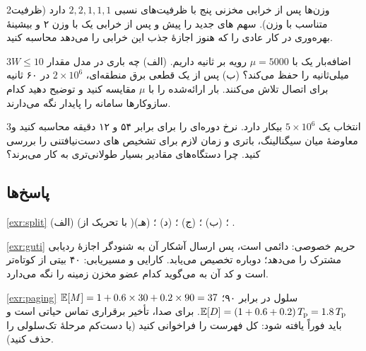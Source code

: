 \documentclass[11pt,a4paper]{article}
\begin{document}
\begin{exercisebox}{2}{وزن‌ها پس از خرابی}\label{exr:weights}
مخزنی پنج  با ظرفیت‌های نسبی $2,2,1,1,1$ دارد (ظرفیت متناسب با وزن). سهم های جدید را پیش و پس از خرابی
یک  با وزن ۲ و بیشینهٔ بهره‌وری در کار عادی را که هنوز اجازهٔ جذب این خرابی را می‌دهد محاسبه کنید.
\end{exercisebox}

\begin{exercisebox}{3}{اضافه‌بار}\label{exr:overload}
یک  با $\mu = 5000$ رویه بر ثانیه داریم. (الف) چه باری در مدل  مقدار $W \le 10$ میلی‌ثانیه را حفظ
می‌کند؟ (ب) پس از یک قطعی برق منطقه‌ای، $2\times10^6$  در ۶۰ ثانیه برای اتصال تلاش می‌کنند. بار ارائه‌شده را با
$\mu$ مقایسه کنید و توضیح دهید کدام سازوکارها سامانه را پایدار نگه می‌دارند.
\end{exercisebox}

\begin{exercisebox}{3}{انتخاب }\label{exr:t3412}
یک  $5\times10^6$  بیکار دارد. نرخ  دوره‌ای را برای  برابر ۵۴ و ۱۲ دقیقه محاسبه کنید و
معاوضهٔ میان سیگنالینگ، باتری  و زمان لازم برای تشخیص های دست‌نیافتنی را بررسی کنید. چرا دستگاه‌های
 مقادیر بسیار طولانی‌تری به کار می‌برند؟
\end{exercisebox}

\subsection*{پاسخ‌ها}

\begin{solutionbox}{\ref{exr:split}}
(الف)  (با تحریک  از )؛ (ب) ؛ (ج) ؛ (د) ؛
(هـ) .
\end{solutionbox}

\begin{solutionbox}{\ref{exr:guti}}
حریم خصوصی:  دائمی است، پس ارسال آشکار آن به شنودگر اجازهٔ ردیابی مشترک را می‌دهد؛  دوباره تخصیص
می‌یابد. کارایی و مسیریابی:  ۴۰ بیتی از  کوتاه‌تر است و کد  آن به  می‌گوید کدام عضو مخزن
زمینه را نگه می‌دارد.
\end{solutionbox}

\begin{solutionbox}{\ref{exr:paging}}
$\mathbb{E}[M] = 1 + 0.6\times30 + 0.2\times90 = 37$ سلول در برابر ۹۰؛ $\mathbb{E}[D] = (1 + 0.6 + 0.2)\,T_\mathrm{p} = 1.8\,T_\mathrm{p}$. برای
صدا، تأخیر برقراری تماس حیاتی است و  باید فوراً یافته شود: کل فهرست  را فراخوانی کنید (یا دست‌کم مرحلهٔ
تک‌سلولی را حذف کنید).
\end{solutionbox}
\end{document}
